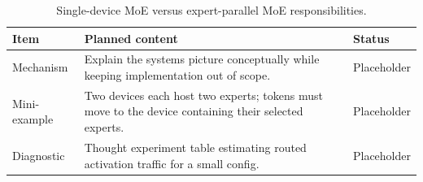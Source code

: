\begin{table}[H]
\centering
\caption{Single-device MoE versus expert-parallel MoE responsibilities.}
\label{tab:ch12-expert-parallelism-and-all-to-all-communication}
\begin{tabularx}{\textwidth}{p{}X p{}}
\toprule
Item & Planned content & Status \\
\midrule
Mechanism & Explain the systems picture conceptually while keeping implementation out of scope. & Placeholder \\
Mini-example & Two devices each host two experts; tokens must move to the device containing their selected experts. & Placeholder \\
Diagnostic & Thought experiment table estimating routed activation traffic for a small config. & Placeholder \\
\bottomrule
\end{tabularx}
\end{table}
